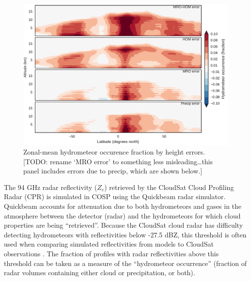 \begin{figure}[htbp]
\centering
\includegraphics{graphics/subgrid1_hfba_zonal_diff.pdf}
\caption{\label{fig:subgrid1_hfba_zonal_diff}Zonal-mean hydrometeor
occurence fraction by height errors. {[}TODO: rename `MRO error' to
something less misleading\ldots{}this panel includes errors due to
precip, which are shown
below.{]}}\label{fig:subgrid1ux5fhfbaux5fzonalux5fdiff}
\end{figure}

The 94 GHz radar reflectivity (\(Z_e\)) retrieved by the CloudSat Cloud
Profiling Radar (CPR) is simulated in COSP using the Quickbeam
\citep{haynes_et_al_2007} radar simulator. Quickbeam accounts for
attenuation due to both hydrometeors and gases in the atmosphere between
the detector (radar) and the hydrometeors for which cloud properties are
being ``retrieved''. Because the CloudSat cloud radar has difficulty
detecting hydrometeors with reflectivities below -27.5 dBZ, this
threshold is often used when comparing simulated reflectivities from
models to CloudSat observations \citep{marchand_et_al_2009}. The
fraction of profiles with radar reflectivities above this threshold can
be taken as a measure of the ``hydrometeor occurrence'' (fraction of
radar volumes containing either cloud or precipitation, or both).

